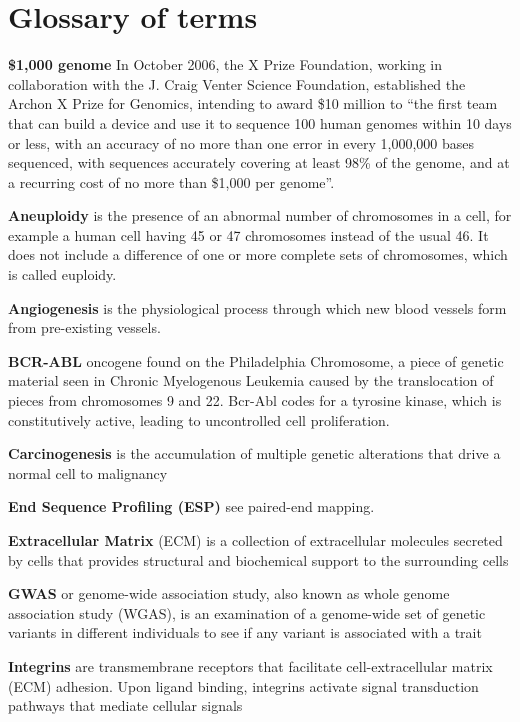 \chapter{Glossary of terms}
\label{AppendixA}

\textbf{\$1,000 genome} In October 2006, the X Prize Foundation, working in collaboration with the J. Craig Venter Science Foundation, established the Archon X Prize for Genomics, intending to award \$10 million to ``the first team that can build a device and use it to sequence 100 human genomes within 10 days or less, with an accuracy of no more than one error in every 1,000,000 bases sequenced, with sequences accurately covering at least 98\% of the genome, and at a recurring cost of no more than \$1,000 per genome''.

\textbf{Aneuploidy} is the presence of an abnormal number of chromosomes in a cell, for example a human cell having 45 or 47 chromosomes instead of the usual 46. It does not include a difference of one or more complete sets of chromosomes, which is called euploidy.

\textbf{Angiogenesis} is the physiological process through which new blood vessels form from pre-existing vessels.

\textbf{BCR-ABL} oncogene found on the Philadelphia Chromosome, a piece of genetic material seen in Chronic Myelogenous Leukemia caused by the translocation of pieces from chromosomes 9 and 22. Bcr-Abl codes for a tyrosine kinase, which is constitutively active, leading to uncontrolled cell proliferation.

\textbf{Carcinogenesis} is the accumulation of multiple genetic alterations that drive a normal cell to malignancy

\textbf{End Sequence Profiling (ESP)} see paired-end mapping.

\textbf{Extracellular Matrix} (ECM) is a collection of extracellular molecules secreted by cells that provides structural and biochemical support to the surrounding cells

\textbf{GWAS} or genome-wide association study, also known as whole genome association study (WGAS), is an examination of a genome-wide set of genetic variants in different individuals to see if any variant is associated with a trait

\textbf{Integrins} are transmembrane receptors that facilitate cell-extracellular matrix (ECM) adhesion. Upon ligand binding, integrins activate signal transduction pathways that mediate cellular signals

